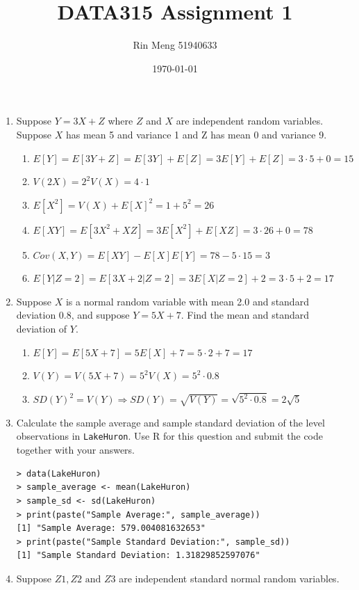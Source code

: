 \documentclass[12pt]{article}
\title{DATA315 Assignment 1}
\author{Rin Meng 51940633}
\date{\today}
\begin{document}
\maketitle

\begin{enumerate}
    \item Suppose $Y = 3X + Z$ where $Z$ and $X$ are independent random variables. Suppose $X$
    has mean 5 and variance 1 and Z has mean 0 and variance 9.
    \begin{enumerate} 
        \item $E[Y] = E[3Y + Z] = E[3Y] + E[Z] = 3E[Y] + E[Z] = 3 \cdot 5 + 0 = 15$
        \item $V(2X) = 2^2V(X) = 4 \cdot 1$
        \item $E[X^2] = V(X) + E[X]^2 = 1 + 5^2 = 26$
        \item $E[XY] = E[3X^2 + XZ] = 3E[X^2] + E[XZ] = 3 \cdot 26 + 0 = 78$
        \item $Cov(X, Y) = E[XY] - E[X]E[Y] = 78 - 5 \cdot 15 = 3$
        \item $E[Y | Z = 2] = E[3X + 2 | Z = 2] = 3E[X | Z = 2] + 2 = 3 \cdot 5 + 2 = 17$
    \end{enumerate}
    \item Suppose $X$ is a normal random variable with mean 2.0 and standard deviation
    0.8, and suppose $Y = 5X + 7$. Find the mean and standard deviation of $Y$.
    \begin{enumerate}
        \item $E[Y] = E[5X + 7] = 5E[X] + 7 = 5 \cdot 2 + 7 = 17$
        \item $V(Y) = V(5X + 7) = 5^2V(X) = 5^2 \cdot 0.8$
        \item $SD(Y)^2 = V(Y) \Rightarrow SD(Y) = \sqrt{V(Y)} = \sqrt{5^2 \cdot 0.8} = 2\sqrt{5}$
    \end{enumerate}
    \item Calculate the sample average and sample standard deviation of the level
    observations in \verb|LakeHuron|. Use R for this question and submit the code together with
    your answers.
    \begin{verbatim}
> data(LakeHuron)
> sample_average <- mean(LakeHuron)
> sample_sd <- sd(LakeHuron)
> print(paste("Sample Average:", sample_average))
[1] "Sample Average: 579.004081632653"
> print(paste("Sample Standard Deviation:", sample_sd))
[1] "Sample Standard Deviation: 1.31829852597076"
    \end{verbatim}
    \item  Suppose $Z1, Z2 \text{ and } Z3$ are independent standard normal random variables.

\end{enumerate}
\end{document}
